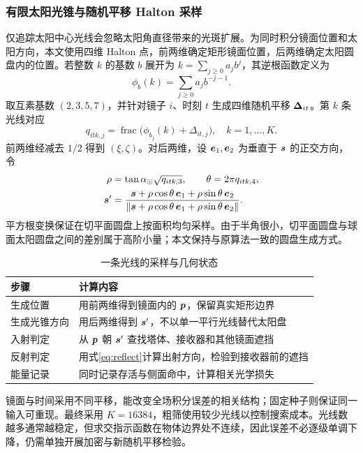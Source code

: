 \pagepart
\subsubsection{有限太阳光锥与随机平移 Halton 采样}
仅追踪太阳中心光线会忽略太阳角直径带来的光斑扩展。为同时积分镜面位置和太阳方向，本文使用四维 Halton 点，前两维确定矩形镜面位置，后两维确定太阳圆盘内的位置\cite{halton}。若整数 $k$ 的基数 $b$ 展开为 $k=\sum_{j\ge0}a_jb^j$，其逆根函数定义为
\begin{equation}
\phi_b(k)=\sum_{j\ge0}a_jb^{-j-1}.
\end{equation}
取互素基数 $(2,3,5,7)$，并针对镜子 $i$、时刻 $t$ 生成四维随机平移 $\bm{\Delta}_{it}$。第 $k$ 条光线对应
\begin{equation}
q_{itk,j}=\operatorname{frac}\bigl(\phi_{b_j}(k)+\Delta_{it,j}\bigr),
\quad k=1,\ldots,K.
\end{equation}
前两维经减去 $1/2$ 得到 $(\xi,\zeta)$。对后两维，设 $\bm{e}_1,\bm{e}_2$ 为垂直于 $\bm{s}$ 的正交方向，令
\begin{align}
\rho&=\tan\alpha_\odot\sqrt{q_{itk,3}},\qquad
\theta=2\pi q_{itk,4},\\
\bm{s}'&=\frac{\bm{s}+\rho\cos\theta\,\bm{e}_1+\rho\sin\theta\,\bm{e}_2}
{\|\bm{s}+\rho\cos\theta\,\bm{e}_1+\rho\sin\theta\,\bm{e}_2\|}.
\end{align}
平方根变换保证在切平面圆盘上按面积均匀采样。由于半角很小，切平面圆盘与球面太阳圆盘之间的差别属于高阶小量；本文保持与原算法一致的圆盘生成方式。

\begin{table}[H]\centering\small
\caption{一条光线的采样与几何状态}
\begin{tabular}{p{36mm}p{107mm}}\toprule
步骤 & 计算内容\\\midrule
生成位置 & 用前两维得到镜面内的 $\bm{p}$，保留真实矩形边界\\
生成光锥方向 & 用后两维得到 $\bm{s}'$，不以单一平行光线替代太阳盘\\
入射判定 & 从 $\bm{p}$ 朝 $\bm{s}'$ 查找塔体、接收器和其他镜面遮挡\\
反射判定 & 用式\eqref{eq:reflect}计算出射方向，检验到接收器前的遮挡\\
能量记录 & 同时记录存活与侧面命中，计算相关光学损失\\
\bottomrule\end{tabular}\end{table}
镜面与时间采用不同平移，能改变全场积分误差的相关结构；固定种子则保证同一输入可重现。最终采用 $K=16384$，粗筛使用较少光线以控制搜索成本。光线数越多通常越稳定，但求交指示函数在物体边界处不连续，因此误差不必逐级单调下降，仍需单独开展加密与新随机平移检验。

